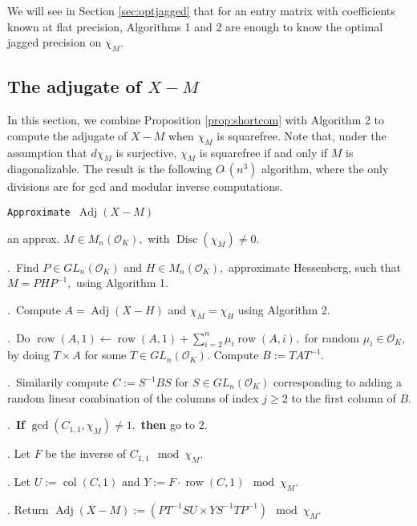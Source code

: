 \documentclass[sigconf]{acmart}
\DeclareMathOperator{\adj}{Adj}
\DeclareMathOperator{\disc}{Disc}
\DeclareMathOperator{\row}{row}
\DeclareMathOperator{\col}{col}
\newcommand{\OK}{\mathcal{O}_K}
\newcommand{\softO}{O\tilde{~}}
\theoremstyle{definition}
\begin{document}
We will see in Section \ref{sec:optjagged} that for an
entry matrix with coefficients known at flat precision,
Algorithms 1 and 2 are enough to
know the optimal jagged precision on $\chi_M.$

\subsection{The adjugate of \texorpdfstring{$X{-}M$}{X-M}}

In this section, we combine Proposition \ref{prop:shortcom}
with Algorithm 2 to compute the adjugate of $X{-}M$
when $\chi_M$ is squarefree.   Note that, under
the assumption that $d\chi_M$ is surjective,
$\chi_M$ is squarefree if and only if $M$ is diagonalizable.  The result is
the following $\softO(n^3)$ algorithm, where the only
divisions are for gcd and modular inverse computations.

\noindent\hrulefill

 {\tt Approximate $\adj (X{-}M)$ }

 an approx. $M \in M_n(\OK),$ with $\disc(\chi_M) \neq 0.$ 

\smallskip

.\ Find $P \in GL_n(\OK)$ and $H \in M_n(\OK),$ approximate Hessenberg,
such that $M=PHP^{-1},$ using Algorithm 1. 

.\ Compute $A=\adj (X-H)$ and $\chi_M = \chi_H$ using Algorithm 2.


.\ Do $\row(A,1) \leftarrow \row(A,1)+\sum_{i=2}^n \mu_i \row(A,i),$ for
random $\mu_i \in \OK,$ by doing $T \times A$ for some $T \in GL_n(\OK).$
Compute $B:=TAT^{-1}.$

.\ Similarily compute $C:=S^{-1}BS$ for $S \in GL_n(\OK)$ corresponding to
adding a random linear combination of the columns of index $j \ge 2$
to the first column of $B.$ 

.\  \textbf{If} $\gcd(C_{1,1}, \chi_M) \neq 1,$ \textbf{then} go to 2.

. Let $F$ be the inverse of $C_{1,1} \mod \chi_M$.

. Let $U := \col(C,1)$ and $Y := F \cdot \row(C,1) \mod \chi_M$.

. Return $\adj(X-M):=(PT^{-1}S U \times Y S^{-1} T P^{-1}) \mod \chi_M.$

\vspace{-1ex}\noindent\hrulefill

\medskip
\end{document}
